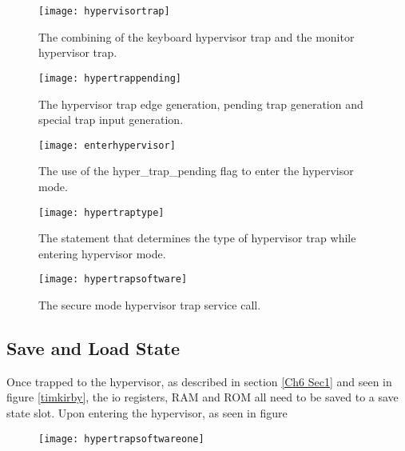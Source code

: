 \begin{figure}
  \centering
  \texttt{[image: hypervisortrap]}
  \caption{The combining of the keyboard hypervisor trap and the monitor hypervisor trap.}
  \label{fig:hypervisortrap}
\end{figure}

\begin{figure}
  \centering
  \texttt{[image: hypertrappending]}
  \caption{The hypervisor trap edge generation, pending trap generation and special trap input generation.}
  \label{fig:hypertrappending}
\end{figure}

\begin{figure}
  \centering
  \texttt{[image: enterhypervisor]}
  \caption{The use of the hyper\_trap\_pending flag to enter the hypervisor mode.}
  \label{fig:enterhypervisor}
\end{figure}

\begin{figure}
  \centering
  \texttt{[image: hypertraptype]}
  \caption{The statement that determines the type of hypervisor trap while entering hypervisor mode.}
  \label{fig:hypertraptype}
\end{figure}

\begin{figure}
  \centering
  \texttt{[image: hypertrapsoftware]}
  \caption{The secure mode hypervisor trap service call.}
  \label{fig:hypertrapsoftware}
\end{figure}


\subsection{Save and Load State}

\label{Ch6 Sec3 Sub2}

Once trapped to the hypervisor, as described in section \ref{Ch6 Sec1} and seen in figure \ref{timkirby}, the io registers, RAM and ROM all need to be saved to a save state slot. Upon entering the hypervisor, as seen in figure

\begin{figure}
  \centering
  \texttt{[image: hypertrapsoftwareone]}
  \caption{}
  \label{fig:hypertrapsoftwareone}
\end{figure}

